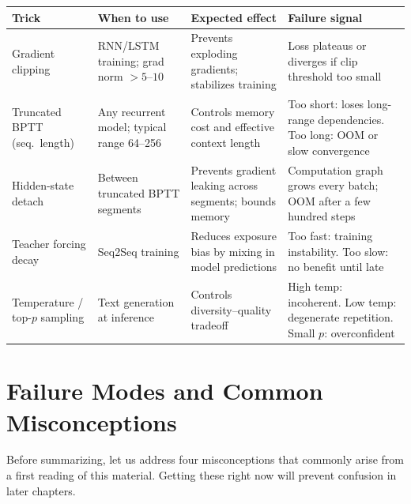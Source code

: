 \noindent
\begin{tabularx}{\textwidth}{@{}>{\raggedright\arraybackslash}p{2.8cm}
                              >{\raggedright\arraybackslash}p{2.8cm}
                              >{\raggedright\arraybackslash}p{3.2cm}
                              X@{}}
\toprule
\textbf{Trick} & \textbf{When to use} & \textbf{Expected effect} & \textbf{Failure signal} \\
\midrule
Gradient clipping &
  RNN/LSTM training; grad norm $> 5$--$10$ &
  Prevents exploding gradients; stabilizes training &
  Loss plateaus or diverges if clip threshold too small \\[4pt]
Truncated BPTT (seq.\ length) &
  Any recurrent model; typical range 64--256 &
  Controls memory cost and effective context length &
  Too short: loses long-range dependencies. Too long: OOM or slow convergence \\[4pt]
Hidden-state detach &
  Between truncated BPTT segments &
  Prevents gradient leaking across segments; bounds memory &
  Computation graph grows every batch; OOM after a few hundred steps \\[4pt]
Teacher forcing decay &
  Seq2Seq training &
  Reduces exposure bias by mixing in model predictions &
  Too fast: training instability. Too slow: no benefit until late \\[4pt]
Temperature / top-$p$ sampling &
  Text generation at inference &
  Controls diversity--quality tradeoff &
  High temp: incoherent. Low temp: degenerate repetition. Small $p$: overconfident \\
\bottomrule
\end{tabularx}

\section{Failure Modes and Common Misconceptions}

Before summarizing, let us address four misconceptions that commonly arise from a first reading of this material. Getting these right now will prevent confusion in later chapters.

